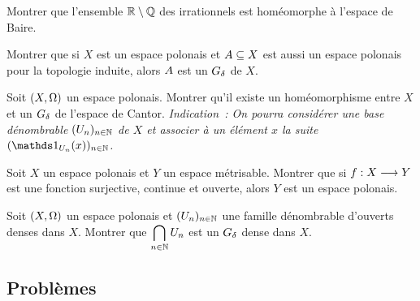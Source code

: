 \begin{exercise}
  Montrer que l'ensemble $\mathbb R\setminus \mathbb Q$ des irrationnels est homéomorphe à
  l'espace de Baire.
\end{exercise}

\begin{exercise}
  Montrer que si $X$ est un espace polonais et $A\subseteq X$ est aussi un
  espace polonais pour la topologie induite, alors $A$ est un $G_{\delta}$ de
  $X$.
\end{exercise}

\begin{exercise}
  Soit $(X,\Omega)$ un espace polonais. Montrer qu'il existe un homéomorphisme
  entre $X$ et un $G_{\delta}$ de l'espace de Cantor. \textit{Indication~: On pourra
    considérer une base dénombrable $(U_n)_{n\in\mathbb N}$ de $X$ et associer à
    un élément $x$ la suite $(\indicP{\varOp_n}(x))_{n\in\bN}$.}
\end{exercise}

\begin{exercise}
  Soit $X$ un espace polonais et $Y$ un espace métrisable. Montrer que si
  $f : \displaystyle X \longrightarrow Y$ est une fonction surjective, continue et ouverte,
  alors $Y$ est un espace polonais.
\end{exercise}

\begin{exercise}\label{exo.baire}
  Soit $(X,\Omega)$ un espace polonais et $(U_n)_{n \in \mathbb N}$ une famille
  dénombrable d'ouverts denses dans $X$. Montrer que
  $\displaystyle \bigcap_{n \in \mathbb N} U_n$ est un $G_{\delta}$ dense dans $X$.
\end{exercise}

\clearpage

\subsection{Problèmes}

